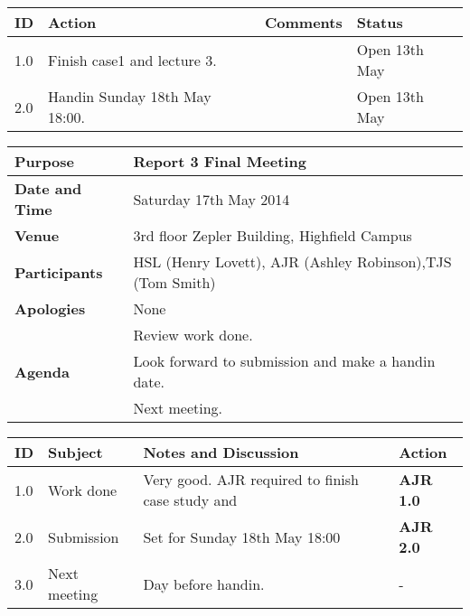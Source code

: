 \begin{center}
\begin{longtable}{| p{} | >{\raggedright\arraybackslash}p{} |  p{} | >{\raggedright\arraybackslash}p{}|} \hline
\textbf{ID} & \textbf{Action} & \textbf{Comments} & \textbf{Status} \\ \hline
\endhead
1.0	&	Finish case1 and lecture 3.	&	& Open 13th May \\ \hline
2.0	&	Handin Sunday 18th May 18:00.	&	&	Open 13th May \\ \hline
\end{longtable}
\end{center}







\begin{center}
\begin{longtable}{| m{} | m{} |} \hline
\textbf{Purpose} & Report 3 Final Meeting \\ \hline
\textbf{Date and Time} & Saturday 17th May 2014 \\ \hline
\textbf{Venue} & 3rd floor Zepler Building, Highfield Campus \\ \hline
\textbf{Participants} & HSL (Henry Lovett), AJR (Ashley Robinson),TJS (Tom Smith)\\ \hline
\textbf{Apologies} & None \\ \hline
\multirow{3}{*}{\textbf{Agenda}} & Review work done. \\ 
  & Look forward to submission and make a handin date. \\
  & Next meeting.\\  \hline
\end{longtable}
\end{center}

\begin{center}
\begin{longtable}{| p{} |>{\raggedright\arraybackslash}p{} | p{} |>{\raggedright\arraybackslash}p{}|} \hline
\textbf{ID} & \textbf{Subject} & \textbf{Notes and Discussion} & \textbf{Action} \\ \hline
\endhead
1.0	&	Work done	&	Very good. AJR required to finish case study and &   \textbf{AJR 1.0}	 \\ \hline
2.0 & Submission  & Set for Sunday 18th May 18:00 &  \textbf{AJR 2.0} \\ \hline
3.0 & Next meeting &  Day before handin. & - \\ \hline

\end{longtable}
\end{center}

